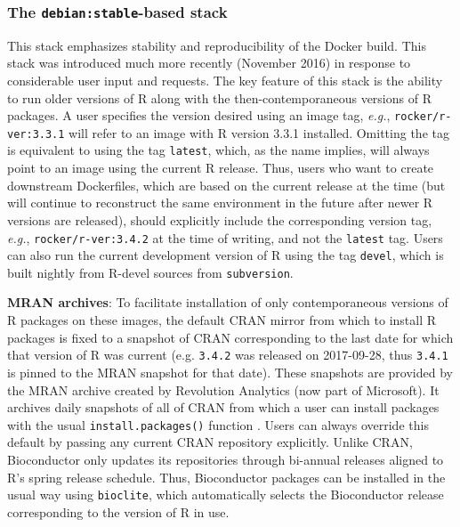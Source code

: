 \subsubsection{\texorpdfstring{The \texttt{debian:stable}-based
stack}{The debian:stable-based stack}}\label{the-debianstable-based-stack}

This stack emphasizes stability and reproducibility of the Docker build.
This stack was introduced much more recently (November 2016) in response
to considerable user input and requests. The key feature of this stack
is the ability to run older versions of R along with the
then-contemporaneous versions of R packages. A user specifies the
version desired using an image tag, \emph{e.g.},
\texttt{rocker/r-ver:3.3.1} will refer to an image with R version 3.3.1
installed. Omitting the tag is equivalent to using the tag
\texttt{latest}, which, as the name implies, will always point to an
image using the current R release. Thus, users who want to create
downstream Dockerfiles, which are based on the current release at the
time (but will continue to reconstruct the same environment in the
future after newer R versions are released), should explicitly include
the corresponding version tag, \emph{e.g.}, \texttt{rocker/r-ver:3.4.2}
at the time of writing, and not the \texttt{latest} tag. Users can also
run the current development version of R using the tag \texttt{devel},
which is built nightly from R-devel sources from \texttt{subversion}.

\textbf{MRAN archives}: To facilitate installation of only
contemporaneous versions of R packages on these images, the default CRAN
mirror from which to install R packages is fixed to a snapshot of CRAN
corresponding to the last date for which that version of R was current
(e.g. \texttt{3.4.2} was released on 2017-09-28, thus \texttt{3.4.1} is
pinned to the MRAN snapshot for that date). These snapshots are provided
by the MRAN archive created by Revolution Analytics (now part of
Microsoft). It archives daily snapshots of all of CRAN from which a user
can install packages with the usual \texttt{install.packages()} function
\citep{MRAN}. Users can always override this default by passing any
current CRAN repository explicitly. Unlike CRAN, Bioconductor only
updates its repositories through bi-annual releases aligned to R's
spring release schedule. Thus, Bioconductor packages can be installed in
the usual way using \texttt{bioclite}, which automatically selects the
Bioconductor release corresponding to the version of R in use.

